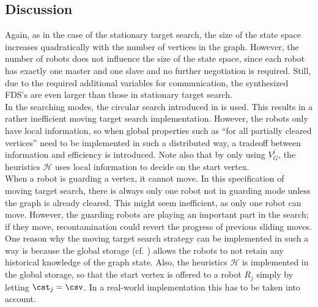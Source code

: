 \subsection{Discussion}


Again, as in the case of the stationary target search, the size of the state space increases quadratically with the number of vertices in the graph. However, the number of robots does not influence the size of the state space, since each robot has exactly one master and one slave and no further negotiation is required. Still, due to the required additional variables for communication, the synthesized FDS's are even larger than those in stationary target search.\\

In the searching modes, the circular search introduced in  is used. This results in a rather inefficient moving target search implementation. However, the robots only have local information, so when global properties such as ``for all partially cleared vertices'' need to be implemented in such a distributed way, a tradeoff between information and efficiency is introduced. Note also that by only using $V_G^i$, the heuristics $\mathcal{H}$ uses local information to decide on the start vertex.\\

When a robot is guarding a vertex, it cannot move. In this specification of moving target search, there is always only one robot not in guarding mode unless the graph is already cleared. This might seem inefficient, as only one robot can move. However, the guarding robots are playing an important part in the search; if they move, recontamination could revert the progress of previous sliding moves.\\

One reason why the moving target search strategy can be implemented in such a way is because the global storage (cf. ) allows the robots to not retain any historical knowledge of the graph state. Also, the heuristics $\mathcal{H}$ is implemented in the global storage, so that the start vertex is offered to a robot $R_j$ simply by letting $\cst_j = \csv$. In a real-world implementation this has to be taken into account.\\
